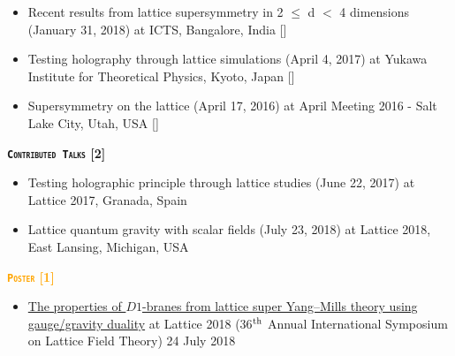 \begin{itemize}
  
  \item Recent results from lattice supersymmetry in 2 $\le$ d $<$ 4 dimensions (January 31, 2018) at ICTS, Bangalore, India 
   [\texttt{\textbf{}}] 
  \vspace{1mm} 
  
 \item Testing holography through lattice simulations (April 4, 2017) at Yukawa Institute for Theoretical Physics, Kyoto, Japan
  [\texttt{\textbf{}}]  
 \vspace{1mm} 
 
 
\item Supersymmetry on the lattice (April 17, 2016) at April Meeting 2016 - Salt Lake City, Utah, USA 
 [\texttt{\textbf{}}] 
\end{itemize}



\textcolor{bittersweet}{\textbf{\textsc{\fontsize{10}{38} \bfseries \texttt{Contributed Talks} [2]}}}
\begin{itemize}
  \item Testing holographic principle through lattice studies (June 22, 2017) at Lattice 2017, Granada, Spain \vspace{1mm} 
  \item Lattice quantum gravity with scalar fields (July 23, 2018) at Lattice 2018, East Lansing, Michigan, USA   
\end{itemize}
 

\textcolor{orange}{\textbf{\textsc{\fontsize{10}{38} \bfseries \texttt{Poster} [1]}}}
  \begin{itemize}
 \item \href{https://indico.fnal.gov/event/15949/session/4/contribution/66}{The properties of $D1$-branes from lattice super Yang--Mills theory using gauge/gravity duality} at Lattice 2018 (36$^{\rm{th}}$ Annual International Symposium on Lattice Field Theory) \hfill 24 July 2018
\end{itemize}
